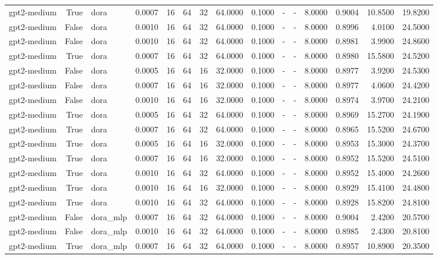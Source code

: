 \begin{tabular}{lrlrrrrrrlllrrr}
gpt2-medium & True & dora & 0.0007 & 16 & 64 & 32 & 64.0000 & 0.1000 & - & - & 8.0000 & 0.9004 & 10.8500 & 19.8200 \\
gpt2-medium & False & dora & 0.0010 & 16 & 64 & 32 & 64.0000 & 0.1000 & - & - & 8.0000 & 0.8996 & 4.0100 & 24.5000 \\
gpt2-medium & False & dora & 0.0010 & 16 & 64 & 32 & 64.0000 & 0.1000 & - & - & 8.0000 & 0.8981 & 3.9900 & 24.8600 \\
gpt2-medium & True & dora & 0.0007 & 16 & 64 & 32 & 64.0000 & 0.1000 & - & - & 8.0000 & 0.8980 & 15.5800 & 24.5200 \\
gpt2-medium & False & dora & 0.0005 & 16 & 64 & 16 & 32.0000 & 0.1000 & - & - & 8.0000 & 0.8977 & 3.9200 & 24.5300 \\
gpt2-medium & False & dora & 0.0007 & 16 & 64 & 16 & 32.0000 & 0.1000 & - & - & 8.0000 & 0.8977 & 4.0600 & 24.4200 \\
gpt2-medium & False & dora & 0.0010 & 16 & 64 & 16 & 32.0000 & 0.1000 & - & - & 8.0000 & 0.8974 & 3.9700 & 24.2100 \\
gpt2-medium & True & dora & 0.0005 & 16 & 64 & 32 & 64.0000 & 0.1000 & - & - & 8.0000 & 0.8969 & 15.2700 & 24.1900 \\
gpt2-medium & True & dora & 0.0007 & 16 & 64 & 32 & 64.0000 & 0.1000 & - & - & 8.0000 & 0.8965 & 15.5200 & 24.6700 \\
gpt2-medium & True & dora & 0.0005 & 16 & 64 & 16 & 32.0000 & 0.1000 & - & - & 8.0000 & 0.8953 & 15.3000 & 24.3700 \\
gpt2-medium & True & dora & 0.0007 & 16 & 64 & 16 & 32.0000 & 0.1000 & - & - & 8.0000 & 0.8952 & 15.5200 & 24.5100 \\
gpt2-medium & True & dora & 0.0010 & 16 & 64 & 32 & 64.0000 & 0.1000 & - & - & 8.0000 & 0.8952 & 15.4000 & 24.2600 \\
gpt2-medium & True & dora & 0.0010 & 16 & 64 & 16 & 32.0000 & 0.1000 & - & - & 8.0000 & 0.8929 & 15.4100 & 24.4800 \\
gpt2-medium & True & dora & 0.0010 & 16 & 64 & 32 & 64.0000 & 0.1000 & - & - & 8.0000 & 0.8928 & 15.8200 & 24.8100 \\
gpt2-medium & False & dora_mlp & 0.0007 & 16 & 64 & 32 & 64.0000 & 0.1000 & - & - & 8.0000 & 0.9004 & 2.4200 & 20.5700 \\
gpt2-medium & False & dora_mlp & 0.0010 & 16 & 64 & 32 & 64.0000 & 0.1000 & - & - & 8.0000 & 0.8985 & 2.4300 & 20.8100 \\
gpt2-medium & True & dora_mlp & 0.0007 & 16 & 64 & 32 & 64.0000 & 0.1000 & - & - & 8.0000 & 0.8957 & 10.8900 & 20.3500 \\

\end{tabular}
